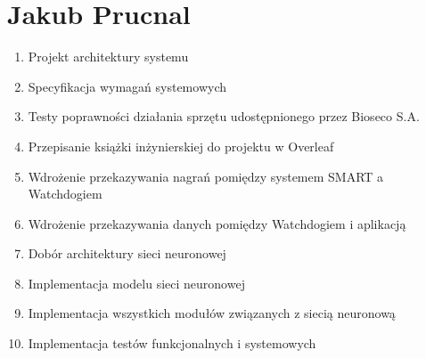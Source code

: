 \documentclass{sprz}
\begin{document}
\section{Jakub Prucnal}
\begin{enumerate}
  \item Projekt architektury systemu
  \item Specyfikacja wymagań systemowych
  \item Testy poprawności działania sprzętu udostępnionego przez Bioseco S.A.
  \item Przepisanie książki inżynierskiej do projektu w Overleaf
  \item Wdrożenie przekazywania nagrań pomiędzy systemem SMART a Watchdogiem
  \item Wdrożenie przekazywania danych pomiędzy Watchdogiem i aplikacją
  \item Dobór architektury sieci neuronowej
  \item Implementacja modelu sieci neuronowej
  \item Implementacja wszystkich modułów związanych z siecią neuronową
  \item Implementacja testów funkcjonalnych i systemowych

\end{enumerate}
\end{document}
